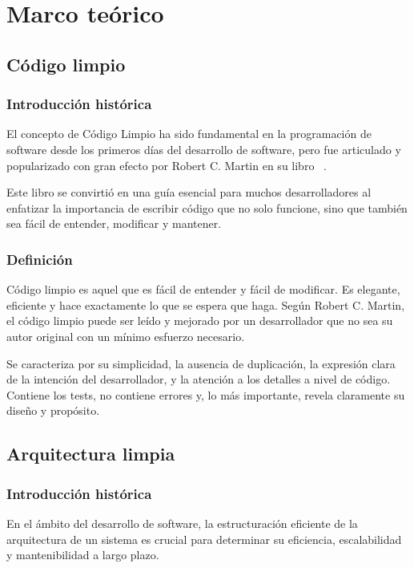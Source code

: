 \chapter{Marco teórico}\label{ch:chapter_2}



\section{Código limpio}

\subsection{Introducción histórica}
El concepto de Código Limpio ha sido fundamental en la programación de software desde los primeros días del desarrollo
de software, pero fue articulado y popularizado con gran efecto por Robert C. Martin en su libro ~\cite{martin2008}.


Este libro se convirtió en una guía esencial para muchos desarrolladores al enfatizar la importancia de escribir código
que no solo funcione, sino que también sea fácil de entender, modificar y mantener.

\subsection{Definición}
Código limpio es aquel que es fácil de entender y fácil de modificar.
Es elegante, eficiente y hace exactamente lo que se espera que haga.
Según Robert C. Martin, el código limpio puede ser leído y mejorado por un
desarrollador que no sea su autor original con un mínimo esfuerzo necesario.

Se caracteriza por su simplicidad, la ausencia de duplicación, la expresión clara de la intención del desarrollador, y
la atención a los detalles a nivel de código.
Contiene los tests, no contiene errores y, lo más importante, revela claramente su diseño y propósito.


\section{Arquitectura limpia}

\subsection{Introducción histórica}
En el ámbito del desarrollo de software, la estructuración eficiente de la arquitectura de un sistema
es crucial para determinar su eficiencia, escalabilidad y mantenibilidad a largo plazo.

